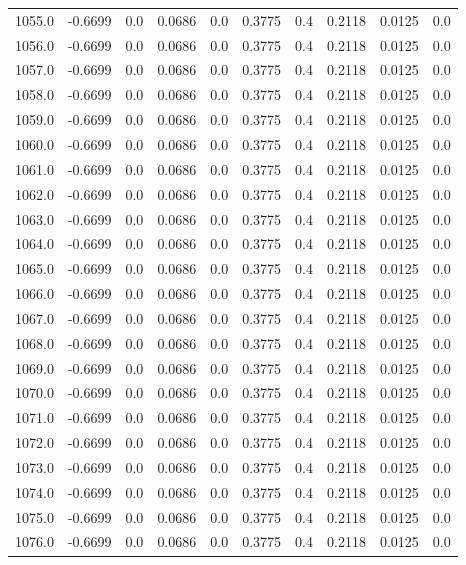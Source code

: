 \begin{longtable}{lrrrrrrrrr}
1055.0 & -0.6699 & 0.0 & 0.0686 & 0.0 & 0.3775 & 0.4 & 0.2118 & 0.0125 & 0.0 \\
1056.0 & -0.6699 & 0.0 & 0.0686 & 0.0 & 0.3775 & 0.4 & 0.2118 & 0.0125 & 0.0 \\
1057.0 & -0.6699 & 0.0 & 0.0686 & 0.0 & 0.3775 & 0.4 & 0.2118 & 0.0125 & 0.0 \\
1058.0 & -0.6699 & 0.0 & 0.0686 & 0.0 & 0.3775 & 0.4 & 0.2118 & 0.0125 & 0.0 \\
1059.0 & -0.6699 & 0.0 & 0.0686 & 0.0 & 0.3775 & 0.4 & 0.2118 & 0.0125 & 0.0 \\
1060.0 & -0.6699 & 0.0 & 0.0686 & 0.0 & 0.3775 & 0.4 & 0.2118 & 0.0125 & 0.0 \\
1061.0 & -0.6699 & 0.0 & 0.0686 & 0.0 & 0.3775 & 0.4 & 0.2118 & 0.0125 & 0.0 \\
1062.0 & -0.6699 & 0.0 & 0.0686 & 0.0 & 0.3775 & 0.4 & 0.2118 & 0.0125 & 0.0 \\
1063.0 & -0.6699 & 0.0 & 0.0686 & 0.0 & 0.3775 & 0.4 & 0.2118 & 0.0125 & 0.0 \\
1064.0 & -0.6699 & 0.0 & 0.0686 & 0.0 & 0.3775 & 0.4 & 0.2118 & 0.0125 & 0.0 \\
1065.0 & -0.6699 & 0.0 & 0.0686 & 0.0 & 0.3775 & 0.4 & 0.2118 & 0.0125 & 0.0 \\
1066.0 & -0.6699 & 0.0 & 0.0686 & 0.0 & 0.3775 & 0.4 & 0.2118 & 0.0125 & 0.0 \\
1067.0 & -0.6699 & 0.0 & 0.0686 & 0.0 & 0.3775 & 0.4 & 0.2118 & 0.0125 & 0.0 \\
1068.0 & -0.6699 & 0.0 & 0.0686 & 0.0 & 0.3775 & 0.4 & 0.2118 & 0.0125 & 0.0 \\
1069.0 & -0.6699 & 0.0 & 0.0686 & 0.0 & 0.3775 & 0.4 & 0.2118 & 0.0125 & 0.0 \\
1070.0 & -0.6699 & 0.0 & 0.0686 & 0.0 & 0.3775 & 0.4 & 0.2118 & 0.0125 & 0.0 \\
1071.0 & -0.6699 & 0.0 & 0.0686 & 0.0 & 0.3775 & 0.4 & 0.2118 & 0.0125 & 0.0 \\
1072.0 & -0.6699 & 0.0 & 0.0686 & 0.0 & 0.3775 & 0.4 & 0.2118 & 0.0125 & 0.0 \\
1073.0 & -0.6699 & 0.0 & 0.0686 & 0.0 & 0.3775 & 0.4 & 0.2118 & 0.0125 & 0.0 \\
1074.0 & -0.6699 & 0.0 & 0.0686 & 0.0 & 0.3775 & 0.4 & 0.2118 & 0.0125 & 0.0 \\
1075.0 & -0.6699 & 0.0 & 0.0686 & 0.0 & 0.3775 & 0.4 & 0.2118 & 0.0125 & 0.0 \\
1076.0 & -0.6699 & 0.0 & 0.0686 & 0.0 & 0.3775 & 0.4 & 0.2118 & 0.0125 & 0.0 \\

\end{longtable}
